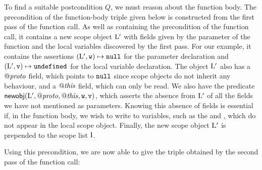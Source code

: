 \documentclass{article}
\begin{document}
To find a suitable postcondition $Q$,  we must reason about the function body. The precondition of the function-body  triple given below
is constructed from the first pass of the function call. As well as containing   the precondition of the function call, it   contains a new scope object ${\mathrm{L}}'$ with fields given by the parameter of the function and the local variables discovered by the first pass. For  our example, it contains the  assertions
$({\mathrm{L}}',\mbox{\texttt{{\upshape w}}})\mapsto\mbox{\texttt{{\upshape null}}}$ for the parameter declaration and  $({\mathrm{L}}',\mbox{\texttt{{\upshape v}}})\mapsto\mbox{\texttt{{\upshape undefined}}}$  for the  local variable declaration. 
The object ${\mathrm{L}}'$ also has a
$\mathit{@proto}$ field, which points to $\mbox{\texttt{{\upshape null}}}$ since scope objects do not inherit
any behaviour, and a $\mathit{@this}$ field,  which can only be read. 
We also 
have the predicate $\mathsf{newobj}({\mathrm{L}}',\mathit{@proto},\mathit{@this},\mbox{\texttt{{\upshape w}}},\mbox{\texttt{{\upshape v}}})$, which
asserts the absence from ${\mathrm{L}}'$ of  all the fields we have not mentioned as parameters. Knowing
this absence of fields  is essential if, in the function body, we  wish to write to variables,  such as the  and  , 
which do not appear in the local scope object. 
Finally, the new scope object ${\mathrm{L}}'$ is prepended to the scope list $\textbf{l}$. 

 Using this precondition, we are now able to  give the triple obtained by the second pass of the function call:


\end{document}

